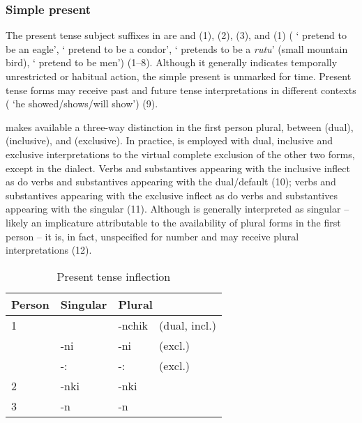 \subsubsection{Simple present}\label{ssec:simplepresent}
The present tense subject suffixes in \SYQ{} are  and \phono{-:} (1),  (2),  (3), and  (1) ( ` pretend to be an eagle',  ` pretend to be a condor',  ` pretends to be a \emph{rutu}' (small mountain bird),  ` pretend to be men') (1--8). Although it generally indicates temporally unrestricted or habitual action, the simple present is unmarked for time. Present tense forms may receive past and future tense interpretations in different contexts ( `he showed/shows/will show') (9). 

\SYQ{} makes available a three-way distinction in the first person plural, between  (dual),  (inclusive), and  (exclusive). In practice,  is employed with dual, inclusive and exclusive interpretations to the virtual complete exclusion of the other two forms, except in the \CH{} dialect. Verbs and substantives appearing with the inclusive  inflect as do verbs and substantives appearing with the dual/default  (10); verbs and substantives appearing with the exclusive  inflect as do verbs and substantives appearing with the singular  (11). Although  is generally interpreted as singular -- likely an implicature attributable to the availability of plural forms in the first person -- it is, in fact, unspecified for number and may receive plural interpretations (12).

\begin{table}[!ht]
\caption{Present tense inflection}\label{Tab16a}
\begin{small}
\begin{center}
\begin{tabular}{llll}
\toprule
Person	& Singular				& \multicolumn{2}{l}{Plural}	\\
\midrule
1		& 						&-nchik				&(dual, incl.)	\\
		&-ni\tss{\AMV,\LT}		&-ni\tss{\AMV,\LT}				&(excl.)		\\
					&-:\tss{\ACH,\CH,\SP}	&-:\tss{\ACH,\CH,\SP}				&(excl.)		\\[2ex]
2		&-nki					&-nki			&\\[2ex]
3		&-n						&-n				&\\
\bottomrule
\end{tabular}
\end{center}
\end{small}
\end{table}

